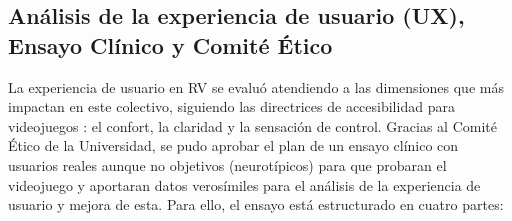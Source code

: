 \documentclass[12pt,twoside,titlepage]{report}
\begin{document}
\subsection{Análisis de la experiencia de usuario (UX), Ensayo Clínico y Comité Ético}

La experiencia de usuario en RV se evaluó atendiendo a las dimensiones que más impactan en este colectivo, siguiendo las directrices de accesibilidad para videojuegos \parencite{gag}: el confort, la claridad y la sensación de control.
Gracias al Comité Ético de la Universidad, se pudo aprobar el plan de un ensayo clínico con usuarios reales aunque no objetivos (neurotípicos) para que probaran el videojuego y aportaran datos verosímiles para el análisis de la experiencia de usuario y mejora de esta.
Para ello, el ensayo está estructurado en cuatro partes:
\end{document}
